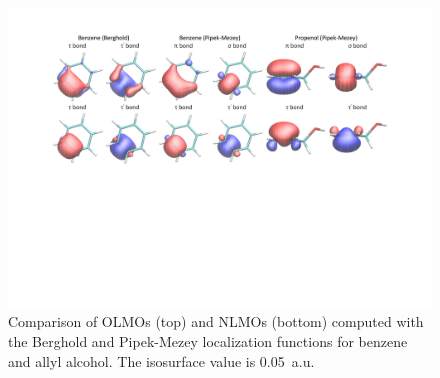 \documentclass[aps,prl,reprint,amsmath,amssymb]{revtex4-1}
\begin{document}
%
\begin{figure}[htbp]
\centering
\includegraphics[scale=0.5]{boys_pipek.pdf}
\caption{Comparison of OLMOs (top) and NLMOs (bottom) computed with the Berghold and Pipek-Mezey localization functions for benzene and allyl alcohol. The isosurface value is 0.05~a.u.}
\label{fig:pipek}
\end{figure}
%
\end{document}
